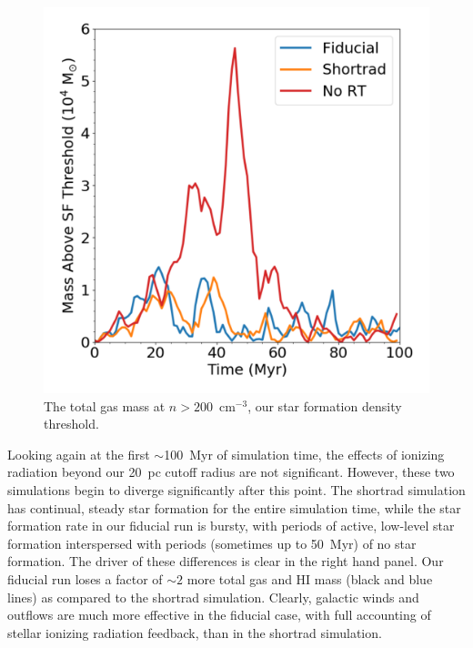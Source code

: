 \documentclass[twocolumn]{aastex62}
\begin{document}
\begin{figure}
\centering
\includegraphics[width=0.99\linewidth]{mass_density_cut}
\caption{The total gas mass at $n > 200$~cm$^{-3}$, our star formation density threshold.}
\label{fig:panel1}
\end{figure}

Looking again at the first $\sim$100~Myr of simulation time, the effects of ionizing radiation beyond our 20~pc cutoff radius are not significant. However, these two simulations begin to diverge significantly after this point. The shortrad simulation has continual, steady star formation for the entire simulation time, while the star formation rate in our fiducial run is bursty, with periods of active, low-level star formation interspersed with periods (sometimes up to 50~Myr) of no star formation. The driver of these differences is clear in the right hand panel. Our fiducial run loses a factor of $\sim 2$ more total gas and HI mass (black and blue lines) as compared to the shortrad simulation. Clearly, galactic winds and outflows are much more effective in the fiducial case, with full accounting of stellar ionizing radiation feedback, than in the shortrad simulation.
\end{document}
